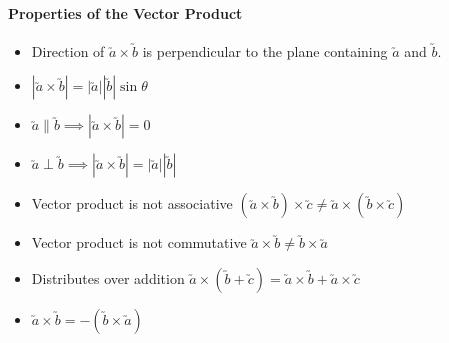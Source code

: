 \documentclass[a4paper,twoside,10pt]{article}
\begin{document}
			\paragraph{Properties of the Vector Product}
				\begin{itemize}
					\item Direction of $\utilde{a}\times\utilde{b}$ is perpendicular to the plane containing $\utilde{a}$ and $\utilde{b}$.
					\item $|\utilde{a}\times\utilde{b}|=|\utilde{a}||\utilde{b}|\sin\theta$
					\item $\utilde{a}\parallel\utilde{b}\implies|\utilde{a}\times\utilde{b}|=0$
					\item $\utilde{a}\perp\utilde{b}\implies|\utilde{a}\times\utilde{b}|=|\utilde{a}||\utilde{b}|$
					\item Vector product is not associative $\left(\utilde{a}\times\utilde{b}\right)\times\utilde{c}\neq\utilde{a}\times\left(\utilde{b}\times\utilde{c}\right)$
					\item Vector product is not commutative $\utilde{a}\times\utilde{b}\neq\utilde{b}\times\utilde{a}$
					\item Distributes over addition $\utilde{a}\times\left(\utilde{b}+\utilde{c}\right)=\utilde{a}\times\utilde{b}+\utilde{a}\times\utilde{c}$
					\item $\utilde{a}\times\utilde{b}=-\left(\utilde{b}\times\utilde{a}\right)$
				\end{itemize}
			
\end{document}
